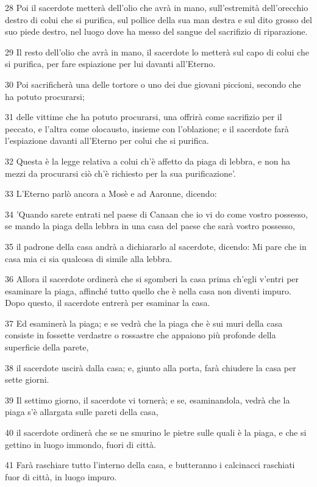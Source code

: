 \par 28 Poi il sacerdote metterà dell'olio che avrà in mano, sull'estremità dell'orecchio destro di colui che si purifica, sul pollice della sua man destra e sul dito grosso del suo piede destro, nel luogo dove ha messo del sangue del sacrifizio di riparazione.
\par 29 Il resto dell'olio che avrà in mano, il sacerdote lo metterà sul capo di colui che si purifica, per fare espiazione per lui davanti all'Eterno.
\par 30 Poi sacrificherà una delle tortore o uno dei due giovani piccioni, secondo che ha potuto procurarsi;
\par 31 delle vittime che ha potuto procurarsi, una offrirà come sacrifizio per il peccato, e l'altra come olocausto, insieme con l'oblazione; e il sacerdote farà l'espiazione davanti all'Eterno per colui che si purifica.
\par 32 Questa è la legge relativa a colui ch'è affetto da piaga di lebbra, e non ha mezzi da procurarsi ciò ch'è richiesto per la sua purificazione'.
\par 33 L'Eterno parlò ancora a Mosè e ad Aaronne, dicendo:
\par 34 'Quando sarete entrati nel paese di Canaan che io vi do come vostro possesso, se mando la piaga della lebbra in una casa del paese che sarà vostro possesso,
\par 35 il padrone della casa andrà a dichiararlo al sacerdote, dicendo: Mi pare che in casa mia ci sia qualcosa di simile alla lebbra.
\par 36 Allora il sacerdote ordinerà che si sgomberi la casa prima ch'egli v'entri per esaminare la piaga, affinché tutto quello che è nella casa non diventi impuro. Dopo questo, il sacerdote entrerà per esaminar la casa.
\par 37 Ed esaminerà la piaga; e se vedrà che la piaga che è sui muri della casa consiste in fossette verdastre o rossastre che appaiono più profonde della superficie della parete,
\par 38 il sacerdote uscirà dalla casa; e, giunto alla porta, farà chiudere la casa per sette giorni.
\par 39 Il settimo giorno, il sacerdote vi tornerà; e se, esaminandola, vedrà che la piaga s'è allargata sulle pareti della casa,
\par 40 il sacerdote ordinerà che se ne smurino le pietre sulle quali è la piaga, e che si gettino in luogo immondo, fuori di città.
\par 41 Farà raschiare tutto l'interno della casa, e butteranno i calcinacci raschiati fuor di città, in luogo impuro.
